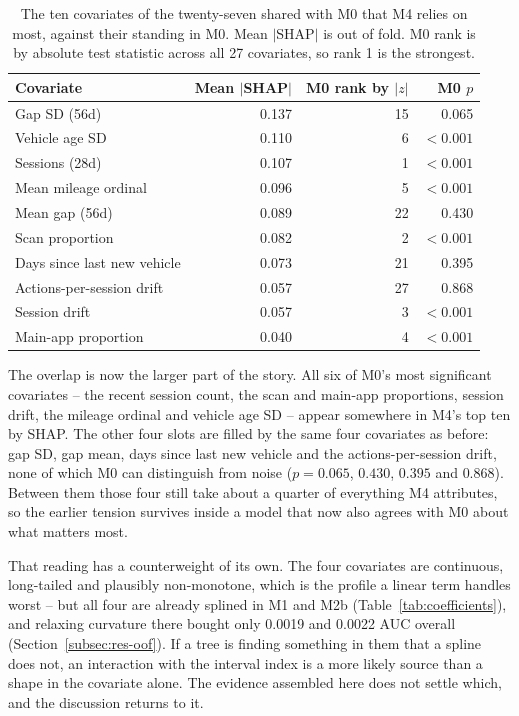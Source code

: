 \begin{table}[htbp]
\centering
\small
\begin{tabular}{@{}lrrr@{}}
\toprule
Covariate & Mean $|$SHAP$|$ & M0 rank by $|z|$ & M0 $p$ \\
\midrule
Gap SD (56d)                 & 0.137 & 15 & 0.065 \\
Vehicle age SD               & 0.110 & 6  & $<0.001$ \\
Sessions (28d)               & 0.107 & 1  & $<0.001$ \\
Mean mileage ordinal         & 0.096 & 5  & $<0.001$ \\
Mean gap (56d)               & 0.089 & 22 & 0.430 \\
Scan proportion              & 0.082 & 2  & $<0.001$ \\
Days since last new vehicle  & 0.073 & 21 & 0.395 \\
Actions-per-session drift    & 0.057 & 27 & 0.868 \\
Session drift                & 0.057 & 3  & $<0.001$ \\
Main-app proportion          & 0.040 & 4  & $<0.001$ \\
\bottomrule
\end{tabular}
\caption{The ten covariates of the twenty-seven shared with M0 that M4 relies on most, against their standing in M0. Mean $|$SHAP$|$ is out of fold. M0 rank is by absolute test statistic across all 27 covariates, so rank 1 is the strongest.}
\label{tab:shap-vs-m0}
\end{table}

The overlap is now the larger part of the story. All six of M0's most significant covariates -- the recent session count, the scan and main-app proportions, session drift, the mileage ordinal and vehicle age SD -- appear somewhere in M4's top ten by SHAP. The other four slots are filled by the same four covariates as before: gap SD, gap mean, days since last new vehicle and the actions-per-session drift, none of which M0 can distinguish from noise ($p = 0.065$, $0.430$, $0.395$ and $0.868$). Between them those four still take about a quarter of everything M4 attributes, so the earlier tension survives inside a model that now also agrees with M0 about what matters most.

That reading has a counterweight of its own. The four covariates are continuous, long-tailed and plausibly non-monotone, which is the profile a linear term handles worst -- but all four are already splined in M1 and M2b (Table~\ref{tab:coefficients}), and relaxing curvature there bought only 0.0019 and 0.0022 AUC overall (Section~\ref{subsec:res-oof}). If a tree is finding something in them that a spline does not, an interaction with the interval index is a more likely source than a shape in the covariate alone. The evidence assembled here does not settle which, and the discussion returns to it.
 

